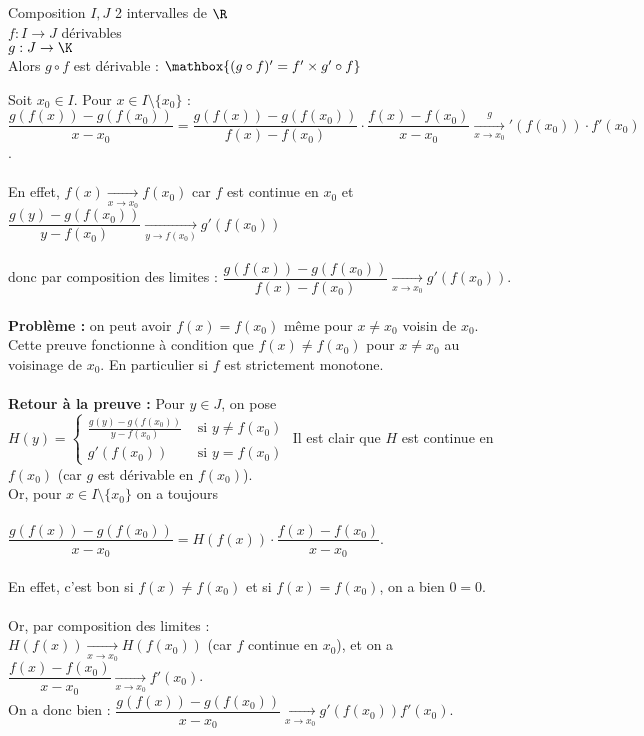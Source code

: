 \documentclass[12pt,a4paper]{report}
\begin{document}
\begin{theoreme}{Composition}{}
$I,J$ 2 intervalles de $\R$\\
$f:I\to J$ \: \: \: \: dérivables\\
$g:J \to \K$\\
Alors $g \circ f$ est dérivable : $\mathbox{(g\circ f)'=f'\times g'\circ f}$
\end{theoreme}

\begin{demo}{}
Soit $x_0 \in I$. Pour $x \in I \setminus \{x_0\}$ : \\
$\dfrac{g(f(x))-g(f(x_0))}{x-x_0} = \dfrac{g(f(x))-g(f(x_0))}{f(x)-f(x_0)} \cdot \dfrac{f(x)-f(x_0)}{x-x_0} \xrightarrow[x \to x_0] g'(f(x_0)) \cdot f'(x_0)$. \\ \\
En effet, $f(x) \xrightarrow[x \to x_0]{} f(x_0)$ car $f$ est continue en $x_0$ et $\dfrac{g(y)-g(f(x_0))}{y-f(x_0)} \xrightarrow[y \to f(x_0)]{} g'(f(x_0))$ \\ \\
donc par composition des limites : $\dfrac{g(f(x))-g(f(x_0))}{f(x)-f(x_0)} \xrightarrow[x \to x_0]{} g'(f(x_0))$. \\ \\

\textbf{Problème :} on peut avoir $f(x)=f(x_0)$ même pour $x \neq x_0$ voisin de $x_0$. Cette preuve fonctionne à condition que $f(x) \neq f(x_0)$ pour $x \neq x_0$ au voisinage de $x_0$. En particulier si $f$ est strictement monotone. \\ \\

\textbf{Retour à la preuve :} \footnotemark Pour $y \in J$, on pose $H(y) =
\begin{cases}
\frac{g(y)-g(f(x_0))}{y-f(x_0)} & \text{ si } y \neq f(x_0) \\
g'(f(x_0)) & \text{ si } y = f(x_0)
\end{cases}$
Il est clair que $H$ est continue en $f(x_0)$ (car $g$ est dérivable en $f(x_0)$). \\
Or, pour $x \in I \setminus \{x_0\}$ on a toujours \\ \\
$\dfrac{g(f(x))-g(f(x_0))}{x-x_0} = H(f(x)) \cdot \dfrac{f(x)-f(x_0)}{x-x_0}$. \\ \\
En effet, c'est bon si $f(x) \neq f(x_0)$ et si $f(x) =f(x_0)$, on a bien $0=0$. \\ \\
Or, par composition des limites : \\
$H(f(x)) \xrightarrow[x \to x_0]{} H(f(x_0))$ (car $f$ continue en $x_0$), et on a $\dfrac{f(x)-f(x_0)}{x-x_0} \xrightarrow[x \to x_0]{} f'(x_0)$. \\
On a donc bien : $\dfrac{g(f(x))-g(f(x_0))}{x-x_0} \xrightarrow[x \to x_0]{} g'(f(x_0))f'(x_0)$.
\end{demo}
\end{document}
